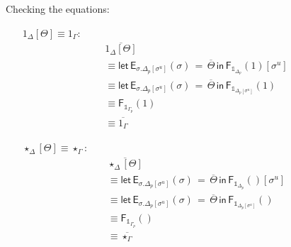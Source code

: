 \documentclass[10pt]{article}
\theoremstyle{definition}
\newcommand\F[2]{\ensuremath{\mathsf{F}_{#1}(#2)}}
\newcommand\FIs[2]{\ensuremath{\mathsf{F}_{#1}{(#2)}}}
\newcommand\EEs[4]{\ensuremath{\mathsf{let} \, \mathsf{E}_{#1}(#3) \, = \, {#2} \, \mathsf{in} \, #4}}
\newcommand\unp[2]{\ensuremath{{#2}^u}}
\newcommand{\modeof}[1]{{#1}_p}
\newcommand{\upstairs}[1]{\overline{#1}}
\newcommand\One{\ensuremath{\mathds{1}}}
\begin{document}
Checking the equations:
\begin{enumerate}[style = multiline, labelwidth = 80pt]
\item[{$1_\Delta[\Theta] \equiv 1_\Gamma$}:] 
\begin{align*}
&\upstairs{1_\Delta[\Theta]} \\
&\equiv \EEs{\sigma.\modeof{\Delta}[\unp{\Delta}{\sigma}]}{\upstairs{\Theta}}{\sigma}{\F{\One_{\modeof{\Delta}}}{1} [\unp{\Delta}{\sigma}]} \\
&\equiv \EEs{\sigma.\modeof{\Delta}[\unp{\Delta}{\sigma}]}{\upstairs{\Theta}}{\sigma}{\F{\One_{\modeof{\Delta}[\unp{\Delta}{\sigma}]}}{1}} \\
&\equiv \F{\One_{\modeof{\Gamma}}}{1} \\
&\equiv \upstairs{1_\Gamma}
\end{align*}

\item[{$\star_\Delta[\Theta] \equiv \star_\Gamma $}:]
\begin{align*}
&\upstairs{\star_\Delta[\Theta]} \\
&\equiv \EEs{\sigma.\modeof{\Delta}[\unp{\Delta}{\sigma}]}{\upstairs{\Theta}}{\sigma}{\FIs{\One_{\modeof{\Delta}}}{}[\unp{\Delta}{\sigma}]} \\
&\equiv \EEs{\sigma.\modeof{\Delta}[\unp{\Delta}{\sigma}]}{\upstairs{\Theta}}{\sigma}{\FIs{\One_{\modeof{\Delta}[\unp{\Delta}{\sigma}]}}{}} \\
&\equiv \FIs{\One_{\modeof{\Gamma}}}{} \\
&\equiv \upstairs{\star_\Gamma}
\end{align*}


\end{enumerate}
\end{document}
